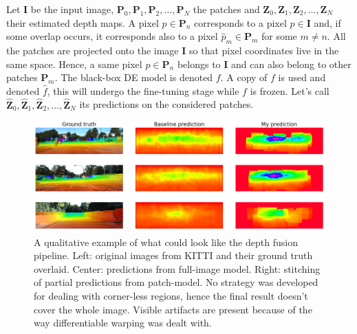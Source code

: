 Let $\mathbf{I}$ be the input image, $\mathbf{P}_{0}, \mathbf{P}_{1}, \mathbf{P}_{2}, \dotsc, \mathbf{P}_{N}$ the patches and $\mathbf{Z}_{0}, \mathbf{Z}_{1}, \mathbf{Z}_{2}, \dotsc, \mathbf{Z}_{N}$ their estimated depth maps.
A pixel $p \in \mathbf{P}_{n}$ corresponds to a pixel $\hat{p} \in \mathbf{I}$ and, if some overlap occurs, it corresponds also to a pixel $\hat{p}_{m} \in \mathbf{P}_{m}$ for some $m \neq n$.
All the patches are projected onto the image $\mathbf{I}$ so that pixel coordinates live in the same space.
Hence, a same pixel $p \in \mathbf{P}_{n}$ belongs to $\mathbf{I}$ and can also belong to other patches $\mathbf{P}_{m}$.
The black-box DE model is denoted $f$.
A copy of $f$ is used and denoted $\hat{f}$, this will undergo the fine-tuning stage while $f$ is frozen.
Let's call $\hat{\mathbf{Z}}_{0}, \hat{\mathbf{Z}}_{1}, \hat{\mathbf{Z}}_{2}, \dotsc, \hat{\mathbf{Z}}_{N}$ its predictions on the considered patches.

\begin{figure}
    \centering
    \includegraphics[scale=0.3]{figs/fusion}
    \caption{
        A qualitative example of what could look like the depth fusion pipeline.
        Left: original images from KITTI and their ground truth overlaid.
        Center: predictions from full-image model.
        Right: stitching of partial predictions from patch-model.
        No strategy was developed for dealing with corner-less regions, hence the final result doesn't cover the whole image.
        Visible artifacts are present because of the way differentiable warping was dealt with.
        \label{fig:fusion}
    }
\end{figure}

